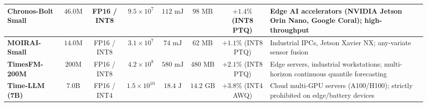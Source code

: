 \begin{table}[t]
{\begin{tabular}{lccccccp{3.8cm}}
\midrule
\textbf{Chronos-Bolt Small} & $46.0\text{M}$ & FP16 / INT8 & $9.5\times 10^7$ & $112\text{ mJ}$ & $98\text{ MB}$ & $+1.4\%$ (INT8 PTQ) & Edge AI accelerators (NVIDIA Jetson Orin Nano, Google Coral); high-throughput \\
\midrule
\textbf{MOIRAI-Small}~\cite{woo2024moirai} & $14.0\text{M}$ & FP16 / INT8 & $3.1\times 10^7$ & $74\text{ mJ}$ & $62\text{ MB}$ & $+1.1\%$ (INT8 PTQ) & Industrial IPCs, Jetson Xavier NX; any-variate sensor fusion \\
\midrule
\textbf{TimesFM-200M}~\cite{das2024timesfm} & $200\text{M}$ & FP16 / INT8 & $4.2\times 10^8$ & $580\text{ mJ}$ & $480\text{ MB}$ & $+2.1\%$ (INT8 PTQ) & Edge servers, industrial workstations; multi-horizon continuous quantile forecasting \\
\midrule
\textbf{Time-LLM (7B)}~\cite{jin2023timellm} & $7.0\text{B}$ & FP16 / INT4 & $1.5\times 10^{10}$ & $18.4\text{ J}$ & $14.2\text{ GB}$ & $+3.8\%$ (INT4 AWQ) & Cloud multi-GPU servers (A100/H100); strictly prohibited on edge/battery devices \\
\bottomrule
\end{tabular}
}
\end{table}

